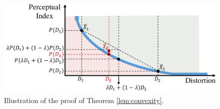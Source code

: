 \begin{figure}
	\begin{center}
		\includegraphics[width=\linewidth]{figures/convexityProof.pdf}
	\end{center}
	\caption{Illustration of the proof of Theorem \ref{lem:convexity}.}
	\label{fig:theoremConvexity}
\end{figure}

